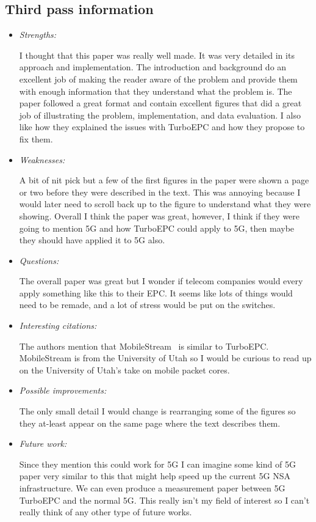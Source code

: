 \documentclass[letterpaper,twocolumn,10pt]{article}
\begin{document}
\subsection{Third pass information}
\label{sec:third}
\begin{itemize}

\item {\it Strengths:} 

I thought that this paper was really well made. It was very detailed in its approach and implementation. The introduction
and background do an excellent job of making the reader aware of the problem and provide them with enough 
information that they understand what the problem is. The paper followed a great format and contain excellent
figures that did a great job of illustrating the problem, implementation, and data evaluation. I also like how they 
explained the issues with TurboEPC and how they propose to fix them.

\item {\it Weaknesses:}

A bit of nit pick but a few of the first figures in the paper were shown a page or two before they were described in the 
text. This was annoying because I would later need to scroll back up to the figure to understand what they were showing.
Overall I think the paper was great, however, I think if they were going to mention 5G and how TurboEPC could apply to
5G, then maybe they should have applied it to 5G also. 

\item {\it Questions:} 

The overall paper was great but I wonder if telecom companies would every apply something like this to their EPC.
It seems like lots of things would need to be remade, and a lot of stress would be put on the switches. 

\item {\it Interesting citations:} 

The authors mention that MobileStream~\cite{mobilestream} is similar to TurboEPC. MobileStream is from the 
University of Utah so I would be curious to read up on the University of Utah's take on mobile packet cores.  

\item {\it Possible improvements:}

The only small detail I would change is rearranging some of the figures so they at-least appear on the same page
where the text describes them. 

\item {\it Future work:}

Since they mention this could work for 5G I can imagine some kind of 5G paper very similar to this that might help
speed up the current 5G NSA infrastructure. We can even produce a measurement paper between 5G TurboEPC
and the normal 5G. This really isn't my field of interest so I can't really think of any other type of future works.

\end{itemize}

{
  \small 
  
  
}
\end{document}
